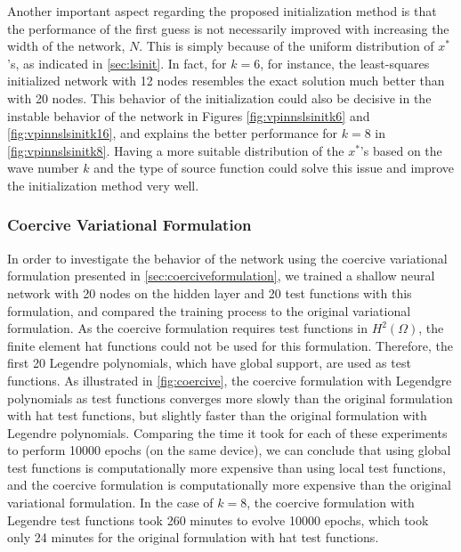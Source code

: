 Another important aspect regarding the proposed initialization method is that the performance of the first guess is not necessarily improved with increasing the width of the network, $N$. This is simply because of the uniform distribution of $x^{*}$'s, as indicated in \autoref{sec:lsinit}. In fact, for $k=6$, for instance, the least-squares initialized network with 12 nodes resembles the exact solution much better than with 20 nodes. This behavior of the initialization could also be decisive in the instable behavior of the network in Figures \ref{fig:vpinnslsinitk6} and \ref{fig:vpinnslsinitk16}, and explains the better performance for $k=8$ in \autoref{fig:vpinnslsinitk8}. Having a more suitable distribution of the $x^{*}$'s based on the wave number $k$ and the type of source function could solve this issue and improve the initialization method very well.

\subsubsection{Coercive Variational Formulation}\label{sec:coerciveresults}
In order to investigate the behavior of the network using the coercive variational formulation presented in \autoref{sec:coerciveformulation}, we trained a shallow neural network with 20 nodes on the hidden layer and 20 test functions with this formulation, and compared the training process to the original variational formulation. As the coercive formulation requires test functions in $H^2(\Omega)$, the finite element hat functions could not be used for this formulation. Therefore, the first 20 Legendre polynomials, which have global support, are used as test functions. As illustrated in \autoref{fig:coercive}, the coercive formulation with Legendgre polynomials as test functions converges more slowly than the original formulation with hat test functions, but slightly faster than the original formulation with Legendre polynomials. Comparing the time it took for each of these experiments to perform 10000 epochs (on the same device), we can conclude that using global test functions is computationally more expensive than using local test functions, and the coercive formulation is computationally more expensive than the original variational formulation. In the case of $k=8$, the coercive formulation with Legendre test functions took 260 minutes to evolve 10000 epochs, which took only 24 minutes for the original formulation with hat test functions.


